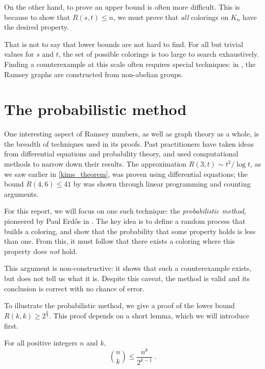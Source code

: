 \documentclass{article}
\begin{document}
On the other hand, to prove an upper bound is often more difficult. This is because to show that $R(s,t) \leq n$, we must prove that \emph{all} colorings on $K_n$ have the desired property.

That is not to say that lower bounds are not hard to find. For all but trivial values for $s$ and $t$, the set of possible colorings is too large to search exhaustively. Finding a counterexample at this scale often requires special techniques: in \citet{exoo2004some}, the Ramsey graphs are constructed from non-abelian groups.


\section{The probabilistic method}

One interesting aspect of Ramsey numbers, as well as graph theory as a whole, is the breadth of techniques used in its proofs. Past practitioners have taken ideas from differential equations and probability theory, and used computational methods to narrow down their results. The approximation $R(3,t) \sim t^2/\log t$, as we saw earlier in \cref{kims_theorem}, was proven using differential equations; the bound $R(4,6) \leq 41$ by \citet{mckay1997subgraph} was shown through linear programming and counting arguments.

For this report, we will focus on one such technique: the \textit{probabilistic method}, pioneered by Paul Erdős in \citeyear{erdos1947some}. The key idea is to define a random process that builds a coloring, and show that the probability that some property holds is less than one. From this, it must follow that there exists a coloring where this property does \emph{not} hold.

This argument is non-constructive: it shows that such a counterexample exists, but does not tell us what it is. Despite this caveat, the method is valid and its conclusion is correct with no chance of error.

To illustrate the probabilistic method, we give a proof of the lower bound $R(k,k) \geq 2^{\frac k 2}$. This proof depends on a short lemma, which we will introduce first.

\begin{Lemma} \label{binomial_bound}
    For all positive integers $n$ and $k$,
    \[ {n \choose k} \leq \frac{n^k}{2^{k-1}} \ . \]
\end{Lemma}
\end{document}
